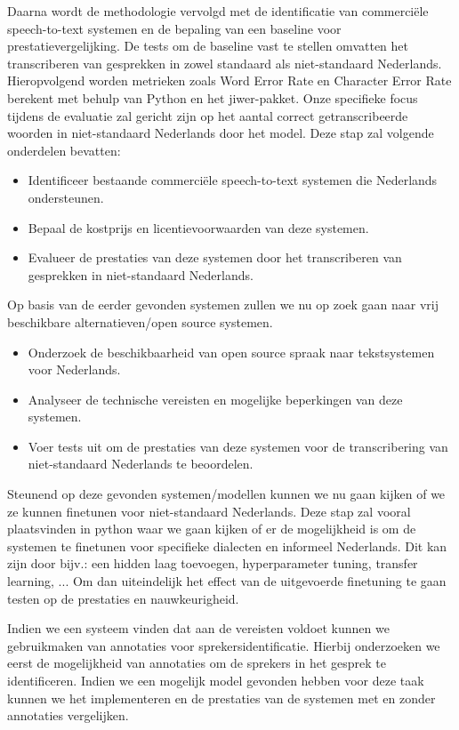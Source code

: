 \par Daarna wordt de methodologie vervolgd met de identificatie van commerciële speech-to-text systemen en de bepaling van een baseline voor prestatievergelijking. De tests om de baseline vast te stellen omvatten het transcriberen van gesprekken in zowel standaard als niet-standaard Nederlands. Hieropvolgend worden metrieken zoals Word Error Rate en Character Error Rate berekent met behulp van Python en het jiwer-pakket. Onze specifieke focus tijdens de evaluatie zal gericht zijn op het aantal correct getranscribeerde woorden in niet-standaard Nederlands door het model.
Deze stap zal volgende onderdelen bevatten:
\begin{itemize}
    \item Identificeer bestaande commerciële speech-to-text systemen die Nederlands ondersteunen.
    \item Bepaal de kostprijs en licentievoorwaarden van deze systemen.
    \item Evalueer de prestaties van deze systemen door het transcriberen van gesprekken in niet-standaard Nederlands.
\end{itemize}   
\par Op basis van de eerder gevonden systemen zullen we nu op zoek gaan naar vrij beschikbare alternatieven/open source systemen.
\begin{itemize}
    \item Onderzoek de beschikbaarheid van open source spraak naar tekstsystemen voor Nederlands.
    \item Analyseer de technische vereisten en mogelijke beperkingen van deze systemen.
    \item Voer tests uit om de prestaties van deze systemen voor de transcribering van niet-standaard Nederlands te beoordelen.
\end{itemize}
\par Steunend op deze gevonden systemen/modellen kunnen we nu gaan kijken of we ze kunnen finetunen voor niet-standaard Nederlands. Deze stap zal vooral plaatsvinden in python waar we gaan kijken of er de mogelijkheid is om de systemen te finetunen voor specifieke dialecten en informeel Nederlands. Dit kan zijn door bijv.: een hidden laag toevoegen, hyperparameter tuning, transfer learning, ... Om dan uiteindelijk het effect van de uitgevoerde finetuning te gaan testen op de prestaties en nauwkeurigheid.

\par Indien we een systeem vinden dat aan de vereisten voldoet kunnen we gebruikmaken van annotaties voor sprekersidentificatie. Hierbij onderzoeken we eerst de mogelijkheid van annotaties om de sprekers in het gesprek te identificeren. Indien we een mogelijk model gevonden hebben voor deze taak kunnen we het implementeren en de prestaties van de systemen met en zonder annotaties vergelijken.


